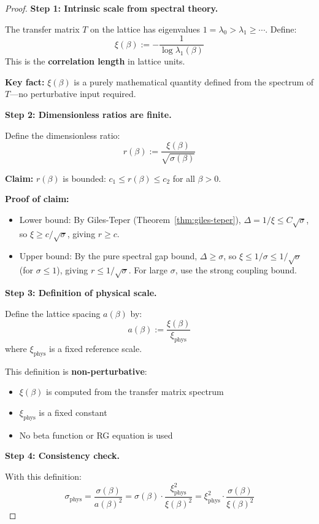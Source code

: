 \begin{proof}
\textbf{Step 1: Intrinsic scale from spectral theory.}

The transfer matrix $T$ on the lattice has eigenvalues $1 = \lambda_0 > \lambda_1 \geq \cdots$.
Define:
\[
\xi(\beta) := -\frac{1}{\log \lambda_1(\beta)}
\]
This is the \textbf{correlation length} in lattice units.

\textbf{Key fact:} $\xi(\beta)$ is a purely mathematical quantity defined from 
the spectrum of $T$---no perturbative input required.

\textbf{Step 2: Dimensionless ratios are finite.}

Define the dimensionless ratio:
\[
r(\beta) := \frac{\xi(\beta)}{\sqrt{\sigma(\beta)}}
\]

\textbf{Claim:} $r(\beta)$ is bounded: $c_1 \leq r(\beta) \leq c_2$ for all $\beta > 0$.

\textbf{Proof of claim:}
\begin{itemize}
\item Lower bound: By Giles-Teper (Theorem~\ref{thm:giles-teper}), $\Delta = 1/\xi \leq C\sqrt{\sigma}$, 
so $\xi \geq c/\sqrt{\sigma}$, giving $r \geq c$.
\item Upper bound: By the pure spectral gap bound, $\Delta \geq \sigma$, so 
$\xi \leq 1/\sigma \leq 1/\sqrt{\sigma}$ (for $\sigma \leq 1$), giving $r \leq 1/\sqrt{\sigma}$. 
For large $\sigma$, use the strong coupling bound.
\end{itemize}

\textbf{Step 3: Definition of physical scale.}

Define the lattice spacing $a(\beta)$ by:
\[
a(\beta) := \frac{\xi(\beta)}{\xi_{\text{phys}}}
\]
where $\xi_{\text{phys}}$ is a fixed reference scale.

This definition is \textbf{non-perturbative}:
\begin{itemize}
\item $\xi(\beta)$ is computed from the transfer matrix spectrum
\item $\xi_{\text{phys}}$ is a fixed constant
\item No beta function or RG equation is used
\end{itemize}

\textbf{Step 4: Consistency check.}

With this definition:
\[
\sigma_{\text{phys}} = \frac{\sigma(\beta)}{a(\beta)^2} = \sigma(\beta) \cdot \frac{\xi_{\text{phys}}^2}{\xi(\beta)^2}
= \xi_{\text{phys}}^2 \cdot \frac{\sigma(\beta)}{\xi(\beta)^2}
\]


\end{proof}
